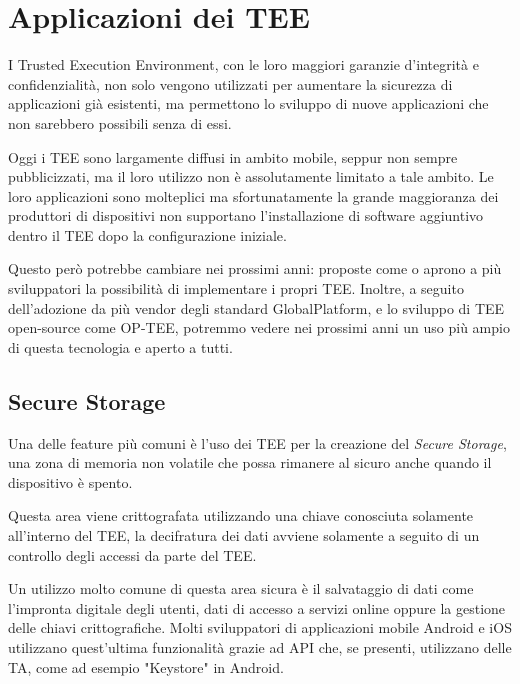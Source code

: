 \documentclass[12pt,italian]{report}
\begin{document}

\section{Applicazioni dei TEE}
\label{sec:applicazioni-tee}
I Trusted Execution Environment, con le loro maggiori garanzie d'integrità
e confidenzialità, non solo vengono utilizzati per aumentare la sicurezza
di applicazioni già esistenti, ma permettono lo sviluppo di nuove
applicazioni che non sarebbero possibili senza di essi.

Oggi i TEE sono largamente diffusi in ambito mobile, seppur non sempre
pubblicizzati, ma il loro utilizzo non è assolutamente limitato a tale ambito.
Le loro applicazioni sono molteplici ma sfortunatamente la grande
maggioranza dei produttori di dispositivi non supportano
l'installazione di software aggiuntivo dentro il TEE dopo la
configurazione iniziale.

Questo però potrebbe cambiare nei prossimi anni: proposte come
\cite{kohlbrenner2020opentees} o \cite{penglai} aprono a più sviluppatori la
possibilità di implementare i propri TEE.
Inoltre, a seguito dell'adozione da più vendor degli standard GlobalPlatform,
e lo sviluppo di TEE open-source come OP-TEE, potremmo vedere nei prossimi
anni un uso più ampio di questa tecnologia e aperto a tutti.

\subsection{Secure Storage}
\label{subsec:secure-storage}
Una delle feature più comuni è l'uso dei TEE per la creazione del
\textit{Secure Storage}, una zona di memoria non volatile che possa rimanere
al sicuro anche quando il dispositivo è spento.

Questa area viene crittografata utilizzando una chiave conosciuta solamente
all'interno del TEE, la decifratura dei dati avviene solamente a seguito di
un controllo degli accessi da parte del TEE.

Un utilizzo molto comune di questa area sicura è il salvataggio di dati
come l'impronta digitale degli utenti, dati di accesso a servizi online
oppure la gestione delle chiavi crittografiche.
Molti sviluppatori di applicazioni mobile Android e iOS utilizzano
quest'ultima funzionalità grazie ad API che, se presenti, utilizzano delle
TA, come ad esempio "Keystore"\cite{androidkeystore} in Android.
\end{document}
